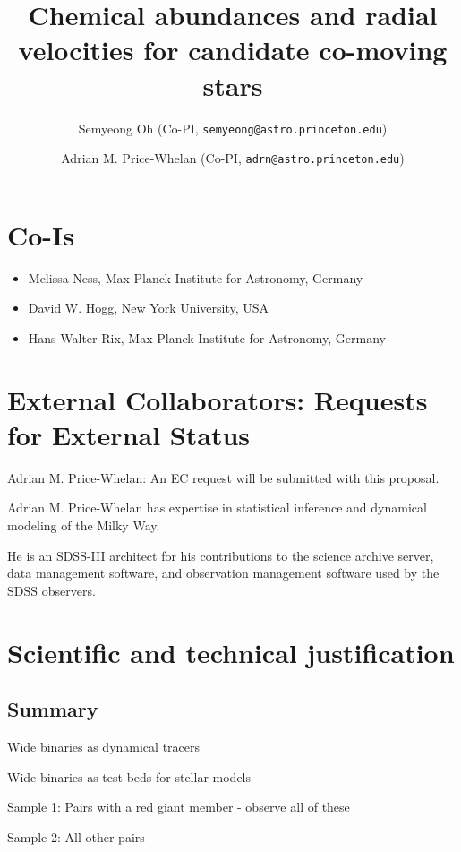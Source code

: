 \documentclass[11pt]{article}
\title{Chemical abundances and radial velocities for candidate co-moving stars}
\author{
  Semyeong Oh (Co-PI, \texttt{semyeong@astro.princeton.edu})
  \and
  Adrian M. Price-Whelan (Co-PI, \texttt{adrn@astro.princeton.edu})
}
\date{}
\begin{document}
\maketitle

\section*{Co-Is}

\begin{itemize}
    \item Melissa Ness, Max Planck Institute for Astronomy, Germany
    \item David W. Hogg, New York University, USA
    \item Hans-Walter Rix, Max Planck Institute for Astronomy, Germany
\end{itemize}

\section*{External Collaborators: Requests for External Status}

Adrian M. Price-Whelan: An EC request will be submitted with this proposal.

Adrian M. Price-Whelan has expertise in statistical inference and dynamical
modeling of the Milky Way.

He is an SDSS-III architect for his contributions to the
science archive server, data management software, and observation management
software used by the SDSS observers.

\section{Scientific and technical justification}

\subsection{Summary}

Wide binaries as dynamical tracers

Wide binaries as test-beds for stellar models

Sample 1: Pairs with a red giant member - observe all of these

Sample 2: All other pairs
\end{document}
